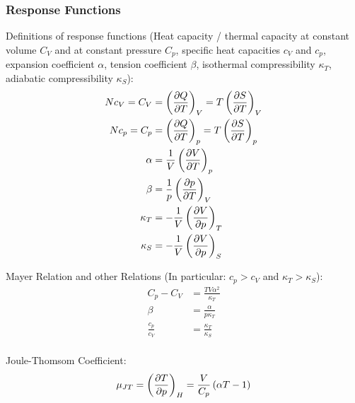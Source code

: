 		\subsubsection{Response Functions}
			\noindent
			Definitions of response functions (Heat capacity / thermal capacity at constant volume $C_V$ and at constant pressure $C_p$, specific heat capacities $c_V$ and $c_p$, expansion coefficient $\alpha$, tension coefficient $\beta$, isothermal compressibility $\kappa_T$, adiabatic compressibility $\kappa_S$):
			\begin{equation}
				\begin{aligned}
					N c_V = C_V &= \left( \frac{\partial Q}{\partial T} \right)_V = T \left( \frac{\partial S}{\partial T} \right)_V \\
					N c_p = C_p &= \left( \frac{\partial Q}{\partial T} \right)_p = T \left( \frac{\partial S}{\partial T} \right)_p \\
					\alpha &= \frac{1}{V} \left( \frac{\partial V}{\partial T} \right)_p \\
					\beta &= \frac{1}{p} \left( \frac{\partial p}{\partial T} \right)_V \\
					\kappa_T &= -\frac{1}{V} \left( \frac{\partial V}{\partial p} \right)_T \\
					\kappa_S &= -\frac{1}{V} \left( \frac{\partial V}{\partial p} \right)_S \\
				\end{aligned}
			\end{equation}

			\noindent
			Mayer Relation and other Relations  (In particular: $c_p > c_V$ and $\kappa_T > \kappa_S$):
			\begin{equation}
				\begin{aligned}
					C_p - C_V &= \frac{TV\alpha^2}{\kappa_T} \\
					\beta &= \frac{\alpha}{p \kappa_T} \\
					\frac{c_p}{c_V} &= \frac{\kappa_T}{\kappa_S} \\
				\end{aligned}
			\end{equation}

			\noindent
			Joule-Thomsom Coefficient:
			\begin{equation}
				\mu_{JT} = \left( \frac{\partial T}{\partial p} \right)_H = \frac{V}{C_p}\left(\alpha T - 1\right)
			\end{equation}

